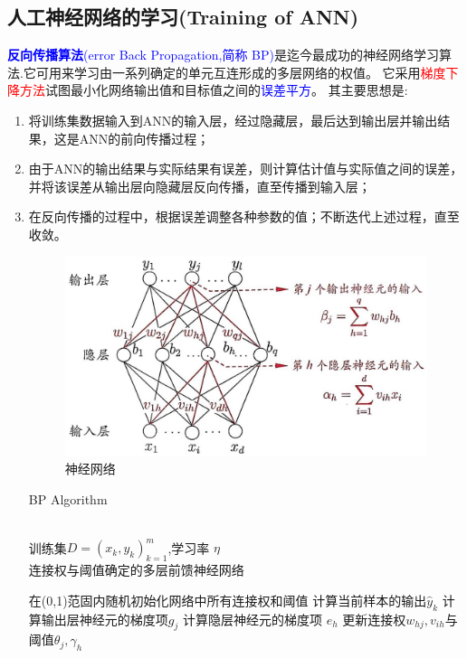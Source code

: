 \subsection{人工神经网络的学习(Training of ANN)}
\textcolor{blue}{\textbf{反向传播算法}(error Back Propagation,简称 BP)}是迄今最成功的神经网络学习算法.它可用来学习由一系列确定的单元互连形成的多层网络的权值。
它采用\textcolor{red}{梯度下降方法}试图最小化网络输出值和目标值之间的\textcolor{blue}{误差平方}。
其主要思想是:
\begin{enumerate}
\item 将训练集数据输入到ANN的输入层，经过隐藏层，最后达到输出层并输出结果，这是ANN的前向传播过程；

\item 由于ANN的输出结果与实际结果有误差，则计算估计值与实际值之间的误差，并将该误差从输出层向隐藏层反向传播，直至传播到输入层；

\item 在反向传播的过程中，根据误差调整各种参数的值；不断迭代上述过程，直至收敛。

\begin{figure}[h]
\small
\centering
\includegraphics[width=14cm]{figure//7.jpg}
\caption{神经网络} \label{fig:7}
\end{figure}

\begin{algorithm}[h]  
\caption{BP Algorithm}  
\begin{algorithmic}[1]  
\REQUIRE ~~\\
训练集$D={(x_k,y_k)}_{k=1}^m$,学习率 $\eta$
\ENSURE ~~\\
连接权与阈值确定的多层前馈神经网络

\STATE 在(0,1)范固内随机初始化网络中所有连接权和阈值
\STATE 计算当前样本的输出$\hat{y}_k$
\STATE 计算输出层神经元的梯度项$g_j$
\STATE 计算隐层神经元的梯度项 $e_h$
\STATE 更新连接权$w_{hj},v_{ih}$与阈值$\theta_j,\gamma_h$
\ENDWHILE
\end{algorithmic}  
\end{algorithm}  
\end{enumerate}

